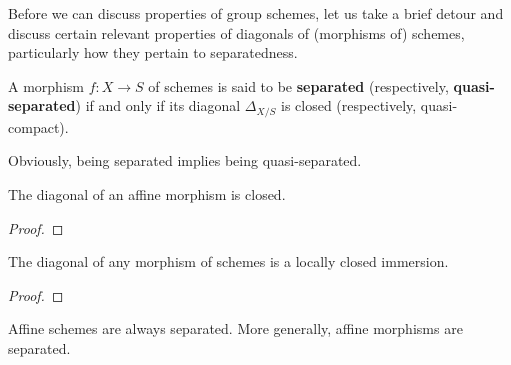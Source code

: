             Before we can discuss properties of group schemes, let us take a brief detour and discuss certain relevant properties of diagonals of (morphisms of) schemes, particularly how they pertain to separatedness.
            \begin{definition} \label{def: (quasi)_separatedness}
                A morphism $f: X \to S$ of schemes is said to be \textbf{separated} (respectively, \textbf{quasi-separated}) if and only if its diagonal $\Delta_{X/S}$ is closed (respectively, quasi-compact). 
            \end{definition}
            \begin{remark}
                Obviously, being separated implies being quasi-separated.
            \end{remark}
            \begin{lemma} \label{lemma: diagonals_of_affines_are_closed}
                The diagonal of an affine morphism is closed.
            \end{lemma}
                \begin{proof}
                    
                \end{proof}
            \begin{proposition} \label{prop: diagonals_of_schemes_are_locally_closed_immersions}
                The diagonal of any morphism of schemes is a locally closed immersion.
            \end{proposition}
                \begin{proof}
                    
                \end{proof}
            \begin{corollary} \label{coro: affines_are_separated}
                Affine schemes are always separated. More generally, affine morphisms are separated. 
            \end{corollary}
